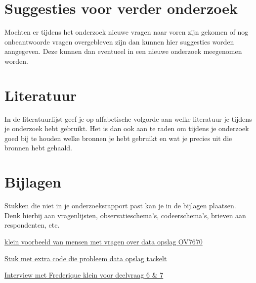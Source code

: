\documentclass{article}
\begin{document}
\section{Suggesties voor verder onderzoek}
Mochten er tijdens het onderzoek nieuwe vragen naar voren zijn gekomen of nog onbeantwoorde vragen overgebleven zijn dan kunnen hier suggesties worden aangegeven. Deze kunnen dan eventueel in een nieuwe onderzoek meegenomen worden.

\section{Literatuur}
In de literatuurlijst geef je op alfabetische volgorde aan welke literatuur je tijdens je onderzoek hebt gebruikt. Het is dan ook aan te raden om tijdens je onderzoek goed bij te houden welke bronnen je hebt gebruikt en wat je precies uit die bronnen hebt gehaald.

\section{Bijlagen}
Stukken die niet in je onderzoeksrapport past kan je in de bijlagen plaatsen. Denk hierbij aan vragenlijsten, observatieschema’s, codeerschema’s, brieven aan respondenten, etc.


\href{https://forum.arduino.cc/index.php?topic=159557.0}{klein voorbeeld van mensen met vragen over data opslag OV7670}  

\href{https://github.com/ComputerNerd/ov7670-simple/blob/master/main.c}{Stuk met extra code die probleem data opslag tackelt}

\href{https://docs.google.com/document/d/1SsX8LF4RwbH1YNNYjNoLCvhxlJQ-Cs8OT3DVWehyQDE/edit?usp=sharing}{Interview met Frederique klein voor deelvraag 6 & 7}



\end{document}
